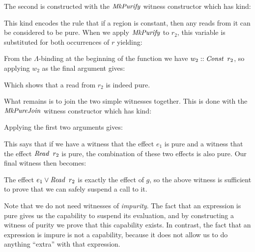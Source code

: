 The second is constructed with the $\operatorname{\mathit{MkPurify}}$ witness constructor which has kind:


This kind encodes the rule that if a region is constant, then any reads from it can be considered to be pure. When we apply $\operatorname{\mathit{MkPurify}}$ to $r_2$, this variable is substituted for both occurrences of $r$ yielding:


From the $\Lambda$-binding at the beginning of the function we have $w_2 :: \operatorname{\mathit{Const}} \ r_2$, so applying $w_2$ as the final argument gives:


Which shows that a read from $r_2$ is indeed pure.

What remains is to join the two simple witnesses together. This is done with the $\operatorname{\mathit{MkPureJoin}}$ witness constructor which has kind:


Applying the first two arguments gives:


This says that if we have a witness that the effect $e_1$ is pure and a witness that the effect $\operatorname{\mathit{Read}} \ r_2$ is pure, the combination of these two effects is also pure. Our final witness then becomes:


The effect $e_1 \lor \operatorname{\mathit{Read}} \ r_2$ is exactly the effect of $g$, so the above witness is sufficient to prove that we can safely suspend a call to it.

Note that we do not need witnesses of \emph{impurity}. The fact that an expression is pure gives us the capability to suspend its evaluation, and by constructing a witness of purity we prove that this capability exists. In contrast, the fact that an expression is impure is not a capability, because it does not allow us to do anything ``extra'' with that expression.










